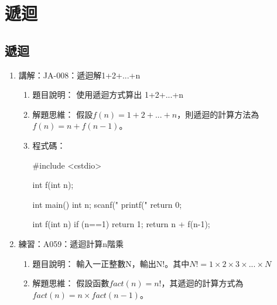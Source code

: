 
\section{遞迴}

\subsection{遞迴}
\begin{enumerate}
	\item 講解：JA-008：遞迴解1+2+...+n
		\begin{enumerate}
			\item 題目說明：
			\subitem 使用遞迴方式算出 1+2+...+n
			
			\item 解題思維：
			\subitem 假設$f(n)=1+2+...+n$，則遞迴的計算方法為$f(n)=n+f(n-1)$。
			
			\item 程式碼：
			\begin{cppcode}
				#include <cstdio>
				
				int f(int n);
				
				int main()
				{
					int n;
					scanf("%
					printf("%
					return 0;
				}
				
				int f(int n)
				{
					if (n==1) return 1;
					return n + f(n-1);
				}
								
			\end{cppcode}
		\end{enumerate}
	
	\item 練習：A059：遞迴計算n階乘
		\begin{enumerate}
			\item 題目說明：
			\subitem 輸入一正整數N，輸出N!。其中$N! = 1\times2\times3\times...\times N$
			
			\item 解題思維：
			\subitem 假設函數$fact(n)=n! $，其遞迴的計算方式為$fact(n)=n\times fact(n-1)$。
\begin{comment}			
			\item 程式碼：
			\begin{cppcode}
				#include<iostream>
				using namespace std;
				
				int fact(int n);

				int main()
				{
					int n;
					cin >> n;
					cout << fact(n);
					return 0;
				}

				int fact(int n)
				{
					if (n) return n * fact(n-1);
					else return 1;
				}


\end{comment}
\end{enumerate}
\end{enumerate}
